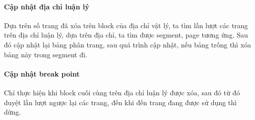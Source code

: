 \paragraph{Cập nhật địa chỉ luận lý}
Dựa trên số trang đã xóa trên block của địa chỉ vật lý, ta tìm lần lượt các trang trên địa chỉ luận lý, dựa trên địa chỉ, ta tìm được segment, page tương ứng. Sau đó cập nhật lại bảng phân trang, sau quá trình cập nhật, nếu bảng trống thì xóa bảng này trong segment đi.



\paragraph{Cập nhật break point}
Chỉ thực hiện khi block cuối cùng trên địa chỉ luận lý được xóa, sau đó từ đó duyệt lần lượt ngược lại các trang, đến khi đến trang đang được sử dụng thì dừng.

